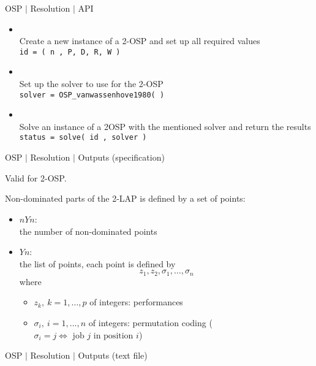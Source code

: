 %
% 
\begin{frame}{OSP $\mid$ Resolution $\mid$ API}

\begin{itemize}
\item  {}\\
          Create a new instance of a 2-OSP and set up all required values    \\
           \texttt{id = \texttt{( n , P, D, R, W ) }} 
           \medskip
\item  {} \\
          Set up the solver to use for the 2-OSP\\
          \texttt{solver = OSP\_vanwassenhove1980( ) }
          \medskip
\item  {}\\
          Solve an instance of a 2OSP with the mentioned solver and return the results \\
          \texttt{status = solve( id , solver ) }
          \medskip
\end{itemize}

\end{frame}

%
% 
\begin{frame}{OSP $\mid$ Resolution $\mid$ Outputs (specification)}

Valid for 2-OSP.
\bigskip

Non-dominated parts of the 2-LAP is defined by a set of points:
\medskip
                           \begin{itemize}
                              \item $nYn$: \\ the number of non-dominated points
                              \item $Yn$: \\the list of points,  each point is defined by 
                              $$ z_1, z_2, \sigma_1, \dots, \sigma_n$$
                              where
                               \begin{itemize}
                                     \item $z_k, \ k=1,\dots,p$ of integers:  performances 
                                     \item $\sigma_i, \ i=1,\dots,n$ of integers:  permutation coding ($\sigma_i=j  \Leftrightarrow \mbox{ job } j \mbox{ in position } i$)
                                \end{itemize}
                           \end{itemize}               

\end{frame}

%
% 
\begin{frame}{OSP $\mid$ Resolution $\mid$ Outputs (text file)}
\end{frame}
